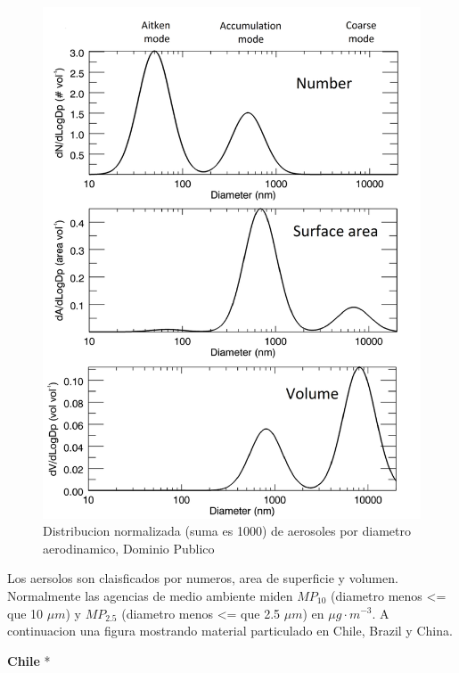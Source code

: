 \documentclass[]{book}
\begin{document}
\begin{figure}
\includegraphics[width=1.2\linewidth]{figs/800px-Synthetic_aerosol_distribution_in_number_area_and_volume_space} \caption{Distribucion normalizada (suma es 1000) de aerosoles por diametro aerodinamico, Dominio Publico}\label{fig:unnamed-chunk-11}
\end{figure}

Los aersolos son claisficados por numeros, area de superficie y volumen. Normalmente las agencias de medio ambiente miden \(MP_{10}\) (diametro menos \textless{}= que 10 \(\mu m\)) y \(MP_{2.5}\) (diametro menos \textless{}= que 2.5 \(\mu m\)) en \(\mu g \cdot m^{-3}\). A continuacion una figura mostrando material particulado en Chile, Brazil y China.

\textbf{Chile }*
\end{document}
